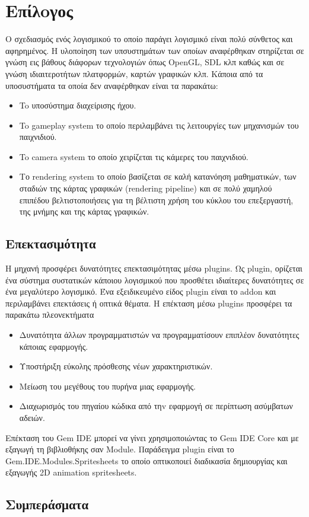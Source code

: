 \chapter{Επίλoγος}
Ο σχεδιασμός ενός λογισμικού το οποίο παράγει λογισμικό είναι πολύ σύνθετος και αφηρημένος. Η υλοποίηση των υπσυστημάτων των οποίων αναφέρθηκαν στηρίζεται σε γνώση εις βάθους διάφορων τεχνολογιών όπως \gls{OpenGL}, SDL κλπ καθώς και σε γνώση ιδιαιτεροτήτων πλατφορμών, καρτών γραφικών κλπ. Κάποια από τα υποσυστήματα τα οποία δεν αναφέρθηκαν είναι τα παρακάτω:
\begin{itemize}
	\item To υποσύστημα διαχείρισης ήχου.
	\item To gameplay system το οποίο περιλαμβάνει τις λειτουργίες των μηχανισμών του παιχνιδιού.
	\item To camera system το οποίο χειρίζεται τις κάμερες του παιχνιδιού. 
	\item Το rendering system το οποίο βασίζεται σε καλή κατανόηση μαθηματικών, των σταδιών της κάρτας γραφικών (rendering pipeline) και σε πολύ χαμηλού επιπέδου βελτιστοποιήσεις για τη βέλτιστη χρήση του κύκλου του επεξεργαστή, της μνήμης και της κάρτας γραφικών.	
\end{itemize}

\section{Επεκτασιμότητα}	
	Η μηχανή προσφέρει δυνατότητες επεκτασιμότητας μέσω plugins.
	Ως plugin, ορίζεται ένα σύστημα συστατικών κάποιου λογισμικού που προσθέτει ιδιαίτερες δυνατότητες σε ένα μεγαλύτερο λογισμικό. Ένα εξειδικευμένο είδος plugin είναι το addon και περιλαμβάνει επεκτάσεις ή οπτικά θέματα. Η επέκταση μέσω plugins προσφέρει τα παρακάτω πλεονεκτήματα
	\begin{itemize}
		\item Δυνατότητα άλλων προγραμματιστών να προγραμματίσουν επιπλέον δυνατότητες κάποιας εφαρμογής.
		\item Υποστήριξη εύκολης πρόσθεσης νέων χαρακτηριστικών.
		\item Μείωση του μεγέθους του πυρήνα μιας εφαρμογής.
		\item Διαχωρισμός του πηγαίου κώδικα από τηv εφαρμογή σε περίπτωση ασύμβατων αδειών.
	\end{itemize}
	Επέκταση του Gem IDE μπορεί να γίνει χρησιμοποιώντας το Gem IDE Core και με εξαγωγή τη βιβλιοθήκης σαν Module. Παράδειγμα plugin είναι το Gem.IDE.Modules.Spritesheets το οποίο οπτικοποιεί διαδικασία δημιουργίας και εξαγωγής 2D animation spritesheets.	
	
\section{Συμπεράσματα}

